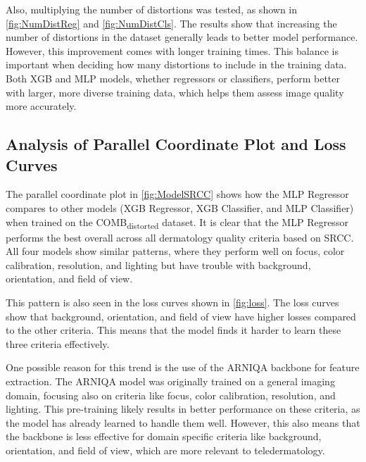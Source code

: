 \vspace{\baselineskip}
\noindent
Also, multiplying the number of distortions was tested, as shown in \autoref{fig:NumDistReg} and \autoref{fig:NumDistCls}. The results show that increasing the number of distortions in the dataset generally leads to better model performance. However, this improvement comes with longer training times. This balance is important when deciding how many distortions to include in the training data. Both XGB and MLP models, whether regressors or classifiers, perform better with larger, more diverse training data, which helps them assess image quality more accurately. \par

\subsection{Analysis of Parallel Coordinate Plot and Loss Curves}
\label{sub:2}
The parallel coordinate plot in \autoref{fig:ModelSRCC} shows how the MLP Regressor compares to other models (XGB Regressor, XGB Classifier, and MLP Classifier) when trained on the COMB\textsubscript{distorted} dataset. It is clear that the MLP Regressor performs the best overall across all dermatology quality criteria based on SRCC. All four models show similar patterns, where they perform well on focus, color calibration, resolution, and lighting but have trouble with background, orientation, and field of view. \par
\vspace{\baselineskip}
\noindent
This pattern is also seen in the loss curves shown in \autoref{fig:loss}. The loss curves show that background, orientation, and field of view have higher losses compared to the other criteria. This means that the model finds it harder to learn these three criteria effectively. \par
\vspace{\baselineskip}
\noindent
One possible reason for this trend is the use of the ARNIQA \autocite{ARNIQA} backbone for feature extraction. The ARNIQA model was originally trained on a general imaging domain, focusing also on criteria like focus, color calibration, resolution, and lighting. This pre-training likely results in better performance on these criteria, as the model has already learned to handle them well. However, this also means that the backbone is less effective for domain specific criteria like background, orientation, and field of view, which are more relevant to teledermatology. \par

